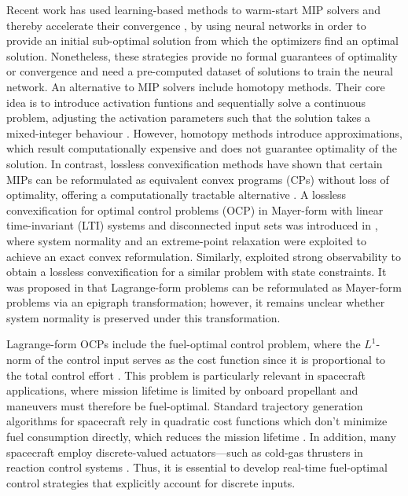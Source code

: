 \documentclass[conf]{new-aiaa}
\begin{document}
Recent work has used learning-based methods to warm-start MIP solvers and thereby accelerate their convergence \cite{cauligi_coco_2022, cauligi_learning_2020}, by using neural networks in order to provide an initial sub-optimal solution from which the optimizers find an optimal solution. Nonetheless, these strategies provide no formal guarantees of optimality or convergence and need a pre-computed dataset of solutions to train the neural network. An alternative to MIP solvers include homotopy methods. Their core idea is to introduce activation funtions and sequentially solve a continuous problem, adjusting the activation parameters such that the solution takes a mixed-integer behaviour \cite{saranathan_relaxed_2018,malyuta_fast_2023,arya_composite_2021}. However, homotopy methods introduce approximations, which result computationally expensive and does not guarantee optimality of the solution. In contrast, lossless convexification methods have shown that certain MIPs can be reformulated as equivalent convex programs (CPs) without loss of optimality, offering a computationally tractable alternative \cite{malyuta_convex_2022}. A lossless convexification for optimal control problems (OCP) in Mayer-form with linear time-invariant (LTI) systems and disconnected input sets was introduced in \cite{harris_optimal_2021}, where system normality and an extreme-point relaxation were exploited to achieve an exact convex reformulation. Similarly, \cite{woodford_geometric_2022} exploited strong observability to obtain a lossless convexification for a similar problem with state constraints. It was proposed in \cite{harris_optimal_2021} that Lagrange-form problems can be reformulated as Mayer-form problems via an epigraph transformation; however, it remains unclear whether system normality is preserved under this transformation. 

Lagrange-form OCPs include the fuel-optimal control problem, where the $L^1$-norm of the control input serves as the cost function since it is proportional to the total control effort \cite{ross_how_2004}. This problem is particularly relevant in spacecraft applications, where mission lifetime is limited by onboard propellant and maneuvers must therefore be fuel-optimal. Standard trajectory generation algorithms for spacecraft rely in quadratic cost functions which don't minimize fuel consumption directly, which reduces the mission lifetime \cite{ross_space_2006}. In addition, many spacecraft employ discrete-valued actuators—such as cold-gas thrusters in reaction control systems \cite{pasand_study_2017,weston_state---art_2025}. Thus, it is essential to develop real-time fuel-optimal control strategies that explicitly account for discrete inputs.
\end{document}
